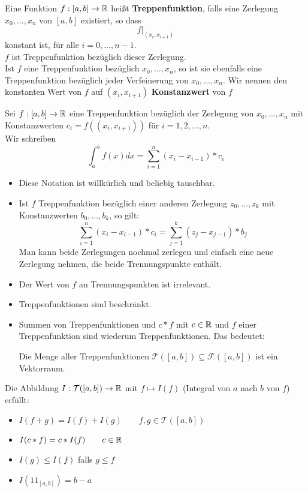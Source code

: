 \documentclass[main.tex]{subfiles}
\begin{document}
\begin{Definition}[Treppenfunktion]
  Eine Funktion $f:[a,b]\to \mathbb{R}$ heißt \textbf{Treppenfunktion}, falls eine Zerlegung $x_0,...,x_n$ von $[a,b]$ existiert, so dass
  $$f|_{(x_i,x_{i+1})}$$
  konstant ist, für alle $i = 0,...,n-1$.\\
  $f$ ist Treppenfunktion bezüglich dieser Zerlegung.\\
  Ist $f$ eine Treppenfunktion bezüglich $x_0,...,x_n$, so ist sie ebenfalls eine Treppenfunktion bezüglich jeder Verfeinerung von $x_0,...,x_n$. Wir nennen den konstanten Wert von $f$ auf $(x_i,x_{i+1})$ \textbf{Konstanzwert} von $f$
\end{Definition}

\begin{Definition}
  Sei $f:[a,b] \to \mathbb{R}$ eine Treppenfunktion bezüglich der Zerlegung von $x_0,...,x_n$ mit Konstanzwerten $c_i = f((x_i,x_{i+1}))$ für $i=1,2,...,n$.\\
  Wir schreiben
  $$\int_a^b f(x)dx = \sum \limits_{i=1}^n (x_i - x_{i-1})*c_i$$
\end{Definition}
\begin{Bemerkung}
  \begin{itemize}
    \item Diese Notation ist willkürlich und beliebig tauschbar.
    \item Ist $f$ Treppenfunktion bezüglich einer anderen Zerlegung $z_0,...,z_k$ mit Konstanzwerten  $b_0,...,b_k$, so gilt:
    $$\sum \limits_{i=1}^n (x_i - x_{i-1})*c_i = \sum \limits_{j=1}^k (z_j - x_{j-1})*b_j$$
    Man kann beide Zerlegungen nochmal zerlegen und einfach eine neue Zerlegung nehmen, die beide Trennungspunkte enthält.
    \item Der Wert von $f$ an Trennungspunkten ist irrelevant.
    \item Treppenfunktionen sind beschränkt.
    \item Summen von Treppenfunktionen und $c*f$ mit $c \in \mathbb{R}$ und $f$ einer Treppenfunktion sind wiederum Treppenfunktionen. Das bedeutet:


    Die Menge aller Treppenfunktionen $\mathcal{T}([a,b]) \subseteq \mathcal{F}([a,b])$ ist ein Vektorraum.
  \end{itemize}
\end{Bemerkung}

\begin{Theorem}
  Die Abbildung $I: \mathcal{T}([a,b]) \to \mathbb{R}$ mit $f \mapsto I(f)$ (Integral von $a$ nach $b$ von $f$) erfüllt:
  \begin{itemize}
    \item $I(f+g) = I(f)+I(g) \qquad f,g \in \mathcal{T}([a,b])$
    \item $I(c * f) = c * I(f) \qquad c \in \mathbb{R}$
    \item $I(g) \leq I(f)$ falls $g \leq f$
    \item $I(1\!\!1_{[a,b]}) = b-a$
  \end{itemize}
\end{Theorem}
\end{document}
